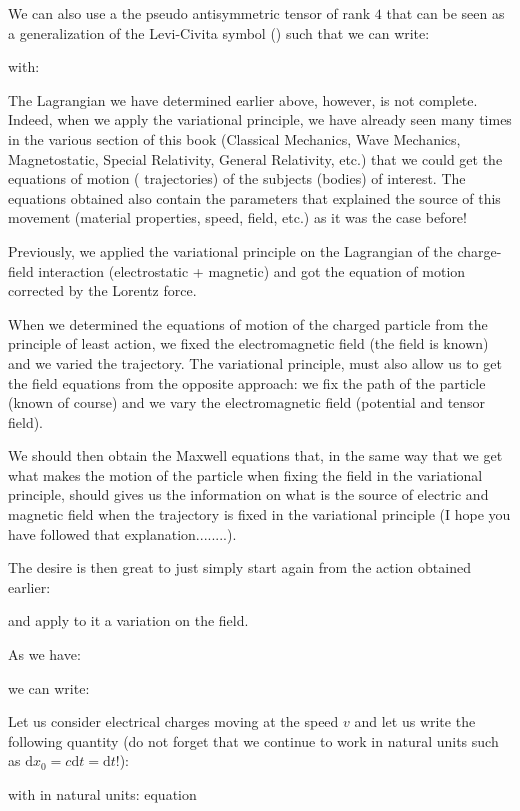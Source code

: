 	We can also use a the pseudo antisymmetric tensor of rank $4$ that can be seen as a generalization of the Levi-Civita symbol () such that we can write:
	
	with:
	
	The Lagrangian we have determined earlier above, however, is not complete. Indeed, when we apply the variational principle, we have already seen many times in the various section of this book (Classical Mechanics, Wave  Mechanics, Magnetostatic, Special Relativity, General Relativity, etc.) that we could get the equations of motion ( trajectories) of the subjects (bodies) of interest. The equations obtained also contain the parameters that explained the source of this movement (material properties, speed, field, etc.) as it was the case before!

	Previously, we applied the variational principle on the Lagrangian of the charge-field interaction (electrostatic + magnetic) and got the equation of motion corrected by the Lorentz force.

	When we determined the equations of motion of the charged particle from the principle of least action, we fixed the electromagnetic field (the field is known) and we varied the trajectory. The variational principle, must also allow us to get the field equations from the opposite approach: we fix the path of the particle (known of course) and we vary the electromagnetic field (potential and tensor field).

	We should then obtain the Maxwell equations that, in the same way that we get what makes the motion of the particle when fixing the field in the variational principle, should gives us the information on what is the source of electric and magnetic field when the trajectory is fixed in the variational principle (I hope you have followed that explanation........).

	The desire is then great to just simply start again from the action obtained earlier:
	
	and apply to it a variation on the field.

	As we have:
	
	we can write:
	
	Let us consider electrical charges moving at the speed $v$ and let us write the following quantity (do not forget that we continue to work in natural units such as $\mathrm{d}x_0=c\mathrm{d}t=\mathrm{d}t$!):
	
	with in natural units: equation
	
